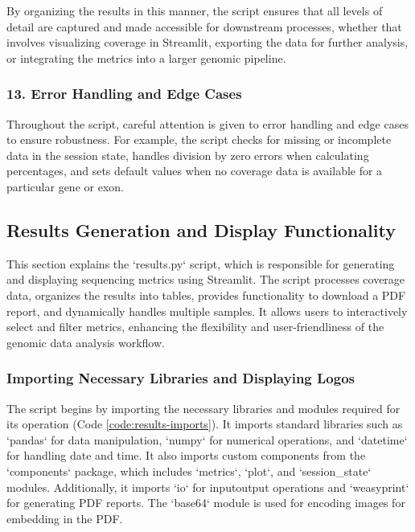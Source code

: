 By organizing the results in this manner, the script ensures that all levels of detail are captured and made accessible for downstream processes, whether that involves visualizing coverage in Streamlit, exporting the data for further analysis, or integrating the metrics into a larger genomic pipeline.

\subsubsection{13. Error Handling and Edge Cases}

Throughout the script, careful attention is given to error handling and edge cases to ensure robustness. For example, the script checks for missing or incomplete data in the session state, handles division by zero errors when calculating percentages, and sets default values when no coverage data is available for a particular gene or exon.

\subsection{Results Generation and Display Functionality}

This section explains the `results.py` script, which is responsible for generating and displaying sequencing metrics using Streamlit. The script processes coverage data, organizes the results into tables, provides functionality to download a PDF report, and dynamically handles multiple samples. It allows users to interactively select and filter metrics, enhancing the flexibility and user-friendliness of the genomic data analysis workflow.

\subsubsection{\textbf{Importing Necessary Libraries and Displaying Logos}}

The script begins by importing the necessary libraries and modules required for its operation (Code \ref{code:results-imports}). It imports standard libraries such as `pandas` for data manipulation, `numpy` for numerical operations, and `datetime` for handling date and time. It also imports custom components from the `components` package, which includes `metrics`, `plot`, and `session\_state` modules. Additionally, it imports `io` for input\/output operations and `weasyprint` for generating PDF reports. The `base64` module is used for encoding images for embedding in the PDF.

